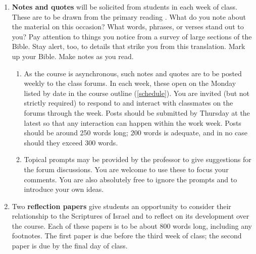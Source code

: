 \documentclass[titlepage]{article}
\begin{document}
\begin{enumerate}

	\item \textbf{Notes and quotes} will be solicited from students in
	each week of class. These are to be drawn from the primary reading
	\cite{njps}. What do you note about the material on this occasion?
	What words, phrases, or verses stand out to you? Pay attention to
	things you notice from a survey of large sections of the Bible. Stay
	alert, too, to details that strike you from this translation. Mark
	up your Bible. Make notes as you read.

	\begin{enumerate}

		\item As the course is asynchronous, such notes and quotes are
		to be posted weekly to the class forums. In each week, these
		open on the Monday listed by date in the course outline
		(\autoref{schedule}). You are invited (but not strictly
		required) to respond to and interact with classmates on the
		forums through the week. Posts should be submitted by Thursday
		at the latest so that any interaction can happen within the work
		week. Posts should be around 250 words long; 200 words is
		adequate, and in no case should they exceed 300 words.

		\item Topical prompts may be provided by the professor to give
		suggestions for the forum discussions. You are welcome to use
		these to focus your comments. You are also absolutely free to
		ignore the prompts and to introduce your own ideas.

	\end{enumerate}

	\item Two \textbf{reflection papers} give students an opportunity to
	consider their relationship to the Scriptures of Israel and to
	reflect on its development over the course. Each of these papers is
	to be about 800 words long, including any footnotes. The first paper
	is due before the third week of class; the second paper is due by
	the final day of class.

	\begin{enumerate}


\end{enumerate}
\end{enumerate}
\end{document}
